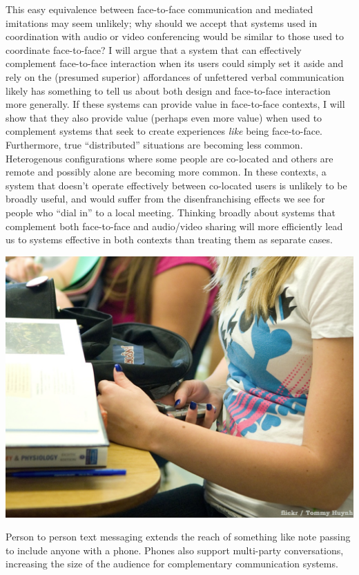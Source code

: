 This easy equivalence between face-to-face communication and mediated imitations may seem unlikely; why should we accept that systems used in coordination with audio or video conferencing would be similar to those used to coordinate face-to-face? I will argue that a system that can effectively complement face-to-face interaction when its users could simply set it aside and rely on the (presumed superior) affordances of unfettered verbal communication likely has something to tell us about both design and face-to-face interaction more generally. If these systems can provide value in face-to-face contexts, I will show that they also provide value (perhaps even more value) when used to complement systems that seek to create experiences \emph{like} being face-to-face. Furthermore, true ``distributed'' situations are becoming less common. Heterogenous configurations where some people are co-located and others are remote and possibly alone are becoming more common. In these contexts, a system that doesn't operate effectively between co-located users is unlikely to be broadly useful, and would suffer from the disenfranchising effects we see for people who ``dial in'' to a local meeting. Thinking broadly about systems that complement both face-to-face and audio/video sharing will more efficiently lead us to systems effective in both contexts than treating them as separate cases.

\begin{marginfigure}
	\includegraphics{figures/texting.png}
	\caption{Person to person text messaging extends the reach of something like note passing to include anyone with a phone. Phones also support multi-party conversations, increasing the size of the audience for complementary communication systems.}
	\label{fig:texting}
\end{marginfigure}




